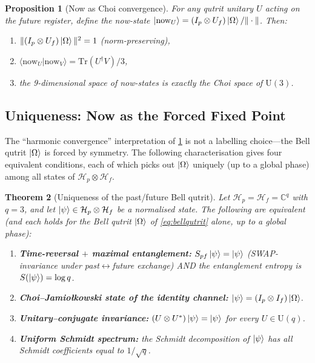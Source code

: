 ﻿\documentclass[12pt]{article}
\newtheorem{theorem}{Theorem}[section]
\newtheorem{proposition}[theorem]{Proposition}
\newcommand{\CC}{\mathbb{C}}
\begin{document}
\begin{proposition}[Now as Choi convergence]\label{prop:now}
For any qutrit unitary $U$ acting on the future register, define the now-state
$\ket{\mathrm{now}_U} = (I_p\otimes U_f)\ket{\Omega}/\|\cdot\|$.  Then:
\begin{enumerate}[label=(\roman*),noitemsep]
  \item $\|(I_p\otimes U_f)\ket{\Omega}\|^2 = 1$ (norm-preserving),
  \item $\langle\mathrm{now}_U|\mathrm{now}_V\rangle = \mathrm{Tr}(U^\dagger V)/3$,
  \item the 9-dimensional space of now-states is exactly the Choi space of $\mathrm{U}(3)$.
\end{enumerate}
\end{proposition}

\subsection{Uniqueness: Now as the Forced Fixed Point}

The ``harmonic convergence'' interpretation of \cref{prop:now} is not a labelling
choice---the Bell qutrit $\ket{\Omega}$ is forced by symmetry.  The following
characterisation gives four equivalent conditions, each of which picks out
$\ket{\Omega}$ uniquely (up to a global phase) among all states of
$\mathcal H_p \otimes \mathcal H_f$.

\begin{theorem}[Uniqueness of the past/future Bell qutrit]\label{thm:bell_uniqueness}
Let $\mathcal H_p = \mathcal H_f = \CC^q$ with $q = 3$, and let
$\ket{\psi} \in \mathcal H_p \otimes \mathcal H_f$ be a normalised state.  The
following are equivalent (and each holds for the Bell qutrit $\ket{\Omega}$ of
\eqref{eq:bellqutrit} alone, up to a global phase):
\begin{enumerate}[label=(\roman*),noitemsep]
  \item \textbf{Time-reversal $+$ maximal entanglement:}
    $S_{pf}\ket{\psi} = \ket{\psi}$ (SWAP-invariance under past$\leftrightarrow$future
    exchange) AND the entanglement entropy is $S(\ket{\psi}) = \log q$.
  \item \textbf{Choi--Jamio\l kowski state of the identity channel:}
    $\ket{\psi} = (I_p\otimes I_f)\ket{\Omega}$.
  \item \textbf{Unitary--conjugate invariance:} $(U \otimes U^*)\ket{\psi} =
    \ket{\psi}$ for every $U \in \mathrm{U}(q)$.
  \item \textbf{Uniform Schmidt spectrum:} the Schmidt decomposition of
    $\ket{\psi}$ has all Schmidt coefficients equal to $1/\sqrt q$.
\end{enumerate}
\end{theorem}
\end{document}
